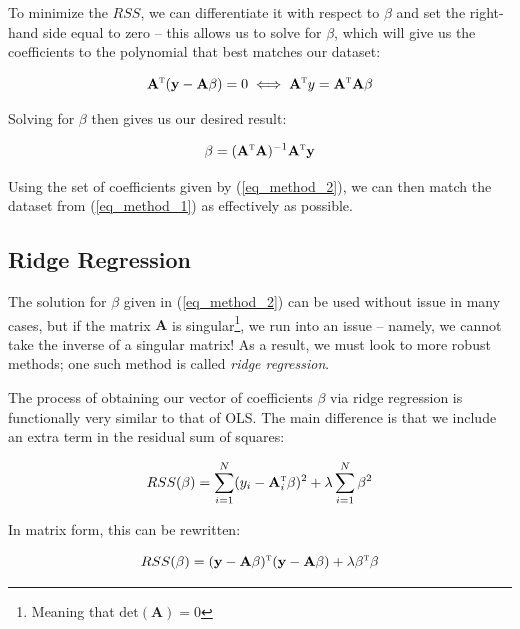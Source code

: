 \documentclass[a4paper,10pt,english]{article}
\begin{document}
To minimize the $RSS$, we can differentiate it with respect to $\beta$ and set the right-hand side equal to zero – this allows us to solve for $\beta$, which will give us the coefficients to the polynomial that best matches our dataset:

\begin{equation*}
\mathbf{A}^\textsc{t} (\mathbf{y} - \mathbf{A} \beta) = 0 \iff \mathbf{A}^\textsc{t} y = \mathbf{A}^\textsc{t} \mathbf{A} \beta
\end{equation*}

Solving for $\beta$ then gives us our desired result:

\begin{equation}
\label{eq_method_2}
\beta = (\mathbf{A}^\textsc{t} \mathbf{A} ) ^{-1} \mathbf{A}^\textsc{t} \mathbf{y}
\end{equation}

Using the set of coefficients given by (\ref{eq_method_2}), we can then match the dataset from (\ref{eq_method_1}) as effectively as possible.

\subsection{Ridge Regression}

The solution for $\beta$ given in (\ref{eq_method_2}) can be used without issue in many cases, but if the matrix $\mathbf{A}$ is singular\footnote{Meaning that $\text{det}(\mathbf{A}) = 0$}, we run into an issue – namely, we cannot take the inverse of a singular matrix!  As a result, we must look to more robust methods; one such method is called \textit{ridge regression}.  

The process of obtaining our vector of coefficients $\beta$ via ridge regression is functionally very similar to that of OLS.  The main difference is that we include an extra term in the residual sum of squares:

\begin{equation*}
RSS(\beta) = \sum_{i=1}^N (y_i - \mathbf{A}_i^\textsc{t} \beta)^2 + \lambda \sum_{i=1}^N \beta^2
\end{equation*}

In matrix form, this can be rewritten:	

\begin{equation*}
RSS(\beta) = (\mathbf{y} - \mathbf{A} \beta)^\textsc{t}(\mathbf{y} - \mathbf{A} \beta) + \lambda \beta^\textsc{t} \beta
\end{equation*}
\end{document}
